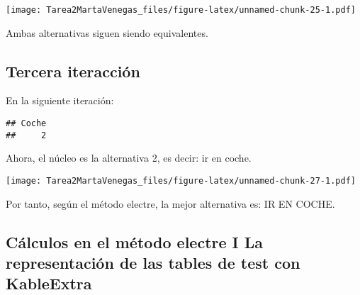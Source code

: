 \documentclass[
]{article}
\newenvironment{Shaded}{\begin{snugshade}}{\end{snugshade}}
\newcommand{\AttributeTok}[1]{\textcolor[rgb]{0.77,0.63,0.00}{#1}}
\newcommand{\CommentTok}[1]{\textcolor[rgb]{0.56,0.35,0.01}{\textit{#1}}}
\newcommand{\ConstantTok}[1]{\textcolor[rgb]{0.00,0.00,0.00}{#1}}
\newcommand{\DecValTok}[1]{\textcolor[rgb]{0.00,0.00,0.81}{#1}}
\newcommand{\FloatTok}[1]{\textcolor[rgb]{0.00,0.00,0.81}{#1}}
\newcommand{\FunctionTok}[1]{\textcolor[rgb]{0.00,0.00,0.00}{#1}}
\newcommand{\NormalTok}[1]{#1}
\newcommand{\OtherTok}[1]{\textcolor[rgb]{0.56,0.35,0.01}{#1}}
\newcommand{\SpecialCharTok}[1]{\textcolor[rgb]{0.00,0.00,0.00}{#1}}
\begin{document}
\texttt{[image: Tarea2MartaVenegas\_files/figure-latex/unnamed-chunk-25-1.pdf]}

Ambas alternativas siguen siendo equivalentes.

\hypertarget{tercera-iteracciuxf3n}{%
\subsection{Tercera iteracción}\label{tercera-iteracciuxf3n}}

En la siguiente iteración:

\begin{Shaded}
\end{Shaded}

\begin{verbatim}
## Coche 
##     2
\end{verbatim}

Ahora, el núcleo es la alternativa 2, es decir: ir en coche.

\begin{Shaded}
\end{Shaded}

\texttt{[image: Tarea2MartaVenegas\_files/figure-latex/unnamed-chunk-27-1.pdf]}

Por tanto, según el método electre, la mejor alternativa es: IR EN
COCHE.

\hypertarget{cuxe1lculos-en-el-muxe9todo-electre-i-la-representaciuxf3n-de-las-tables-de-test-con-kableextra}{%
\subsection{Cálculos en el método electre I La representación de las
tables de test con
KableExtra}\label{cuxe1lculos-en-el-muxe9todo-electre-i-la-representaciuxf3n-de-las-tables-de-test-con-kableextra}}
\end{document}
